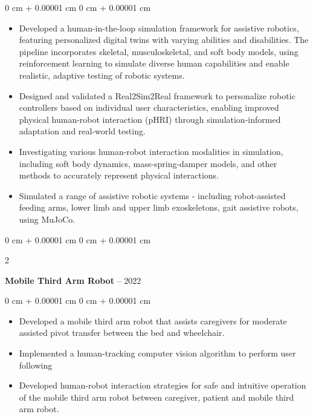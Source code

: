 \documentclass[10pt, letterpaper]{article}
\newenvironment{highlights}{
    \begin{itemize}[
        topsep=0.10 cm,
        parsep=0.10 cm,
        partopsep=0pt,
        itemsep=0pt,
        leftmargin=0 cm + 10pt
    ]
}{
    \end{itemize}
} %
\newenvironment{onecolentry}{
    \begin{adjustwidth}{
        0 cm + 0.00001 cm
    }{
        0 cm + 0.00001 cm
    }
}{
    \end{adjustwidth}
} %
\newenvironment{twocolentry}[2][]{
    \onecolentry
    \def\secondColumn{#2}
    \setcolumnwidth{\fill, 4.5 cm}
    \begin{paracol}{2}
}{
    \switchcolumn \raggedleft \secondColumn
    \end{paracol}
    \endonecolentry
} %
\begin{document}
        \vspace{0.10 cm}
        \begin{onecolentry}
            \begin{highlights}
                \item Developed a human-in-the-loop simulation framework for assistive robotics, featuring personalized digital twins with varying abilities and disabilities. The pipeline incorporates skeletal, musculoskeletal, and soft body models, using reinforcement learning to simulate diverse human capabilities and enable realistic, adaptive testing of robotic systems.
                \item Designed and validated a Real2Sim2Real framework to personalize robotic controllers based on individual user characteristics, enabling improved physical human-robot interaction (pHRI) through simulation-informed adaptation and real-world testing.
                \item Investigating various human-robot interaction modalities in simulation, including soft body dynamics, mass-spring-damper models, and other methods to accurately represent physical interactions.
                \item Simulated a range of assistive robotic systems - including robot-assisted feeding arms, lower limb and upper limb exoskeletons, gait assistive robots, using MuJoCo.
            \end{highlights}
        \end{onecolentry}


        \vspace{0.2 cm}

        \begin{twocolentry}{
            2020 -- 2022
        }
            \textbf{Mobile Third Arm Robot}\end{twocolentry}

        \vspace{0.10 cm}
        \begin{onecolentry}
            \begin{highlights}
                \item Developed a mobile third arm robot that assists caregivers for moderate assisted pivot transfer between the bed and wheelchair.
                \item Implemented a human-tracking computer vision algorithm to perform user following
                \item Developed human-robot interaction strategies for safe and intuitive operation of the mobile third arm robot between caregiver, patient and mobile third arm robot.
            \end{highlights}
        \end{onecolentry}
\end{document}
